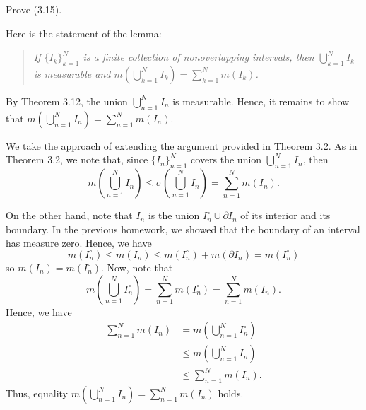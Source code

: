 \begin{problem}
  Prove (3.15).
\end{problem}
\begin{solution}
  Here is the statement of the lemma:
  \begin{quote}
    \emph{If ${\{I_k\}}_{k=1}^{N}$ is a finite collection of nonoverlapping
      intervals, then $\bigcup_{k=1}^NI_k$ is measurable and
      $m\left(\bigcup_{k=1}^NI_k\right)=\sum_{k=1}^Nm(I_k)$.}
  \end{quote}
  By Theorem 3.12, the union $\bigcup_{n=1}^N I_n$ is measurable. Hence, it
  remains to show that
  $m\left(\bigcup_{n=1}^NI_n\right)=\sum_{n=1}^Nm(I_n)$.

  We take the approach of extending the argument provided in Theorem
  3.2. As in Theorem 3.2, we note that, since ${\{I_n\}}_{n=1}^N$ covers
  the union $\bigcup_{n=1}^N I_n$, then
  \[
    m\left(\bigcup_{n=1}^N I_n\right)\leq \sigma%
    \left(\bigcup_{n=1}^N I_n\right)=\sum_{n=1}^N m(I_n).
  \]

  On the other hand, note that $I_n$ is the union
  $I_n^\circ\cup\partial I_n$ of its interior and its boundary. In the
  previous homework, we showed that the boundary of an interval has measure
  zero. Hence, we have
  \[
    m(I_n^\circ)\leq m(I_n)\leq m(I_n^\circ)+m(\partial I_n)=m(I_n^\circ)
  \]
  so $m(I_n)=m(I_n^\circ)$. Now, note that
  \[
    m\left(\bigcup_{n=1}^N I_n^\circ\right)=%
    \sum_{n=1}^N m(I_n^\circ)=%
    \sum_{n=1}^N m(I_n).
  \]
  Hence, we have
  \begin{align*}
    \sum_{n=1}^N m(I_n)
    &=m\left(\bigcup_{n=1}^N I_n^\circ\right)\\
    &\leq m\left(\bigcup_{n=1}^N I_n\right)\\
    &\leq \sum_{n=1}^N m(I_n).
  \end{align*}
  Thus, equality $m\left(\bigcup_{n=1}^NI_n\right)=\sum_{n=1}^Nm(I_n)$
  holds.
\end{solution}

